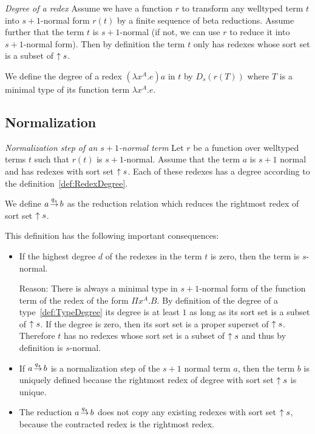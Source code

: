 \begin{definition}
    \label{def:RedexDegree}
    \emph{Degree of a redex} Assume we have a function $r$ to transform any
    welltyped term $t$ into $s+1$-normal form $r(t)$ by a finite sequence of
    beta reductions. Assume further that the term $t$ is $s+1$-normal (if not,
    we can use $r$ to reduce it into $s+1$-normal form). Then by definition the
    term $t$ only has redexes whose sort set is a subset of ${\uparrow s}$.

    We define the degree of a redex $(\lambda x^A.e)a$ in $t$ by $D_s(r(T))$
    where $T$ is a minimal type of its function term $\lambda x^A.e$.
\end{definition}







\subsection{Normalization}


\begin{definition}
    \label{def:NormalizationStep}
    \emph{Normalization step of an $s+1$-normal term}
    Let $r$ be a function over welltyped terms $t$ such that $r(t)$ is
    $s+1$-normal. Assume that the term $a$ is $s+1$ normal and has redexes with
    sort set ${\uparrow s}$. Each of these redexes has a degree according to
    the definition~\ref{def:RedexDegree}.

    We define $a {\,\stackrel{q_s}{\to}\,} b$ as the reduction relation
    which reduces the rightmost redex of sort set ${\uparrow s}$.

    This definition has the following important consequences:
    \begin{itemize}
        \item
            If the highest degree $d$ of the redexes in the term $t$ is zero,
            then the term is $s$-normal.

            Reason: There is always a minimal type in $s+1$-normal form of the
            function term of the redex of the form $\Pi x^A. B$. By definition
            of the degree of a type~\ref{def:TypeDegree} its degree is at least
            $1$ as long as its sort set is a subset of ${\uparrow s}$. If the
            degree is zero, then its sort set is a proper superset of ${\uparrow s}$. Therefore $t$ has no redexes whose sort set is a subset of
            ${\uparrow s}$ and thus by definition is $s$-normal.

        \item
            If $a {\,\stackrel{q_s}{\to}\,} b$ is a normalization step of the $s+1$ normal
            term $a$, then the term $b$ is uniquely defined because the
            rightmost redex of degree with sort set ${\uparrow s}$ is unique.

        \item The reduction $a {\,\stackrel{q_s}{\to}\,} b$ does not copy any existing
            redexes with sort set ${\uparrow s}$, because the contracted redex is
            the rightmost redex.
    \end{itemize}
\end{definition}


